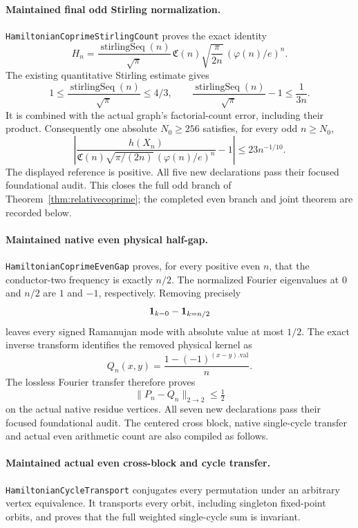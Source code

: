 \paragraph{Maintained final odd Stirling normalization.}
\texttt{HamiltonianCoprimeStirlingCount} proves the exact identity
\[
 H_n=\frac{\operatorname{stirlingSeq}(n)}{\sqrt\pi}\,
       \mathfrak C(n)\sqrt{\frac{\pi}{2n}}\,
                       (\varphi(n)/e)^n.
\]
The existing quantitative Stirling estimate gives
\[
 1\leq\frac{\operatorname{stirlingSeq}(n)}{\sqrt\pi}\leq4/3,
 \qquad
 \frac{\operatorname{stirlingSeq}(n)}{\sqrt\pi}-1
                                      \leq\frac1{3n}.
\]
It is combined with the actual graph's factorial-count error,
including their product. Consequently one absolute
\(N_0\geq256\) satisfies, for every odd \(n\geq N_0\),
\[
 \left|\frac{h(X_n)}
 {\mathfrak C(n)\sqrt{\pi/(2n)}\,(\varphi(n)/e)^n}-1\right|
                                     \leq23n^{-1/10}.
\]
The displayed reference is positive. All five new declarations
pass their focused foundational audit.
This closes the full odd branch of
Theorem~\ref{thm:relativecoprime}; the completed even branch and
joint theorem are recorded below.

\paragraph{Maintained native even physical half-gap.}
\texttt{HamiltonianCoprimeEvenGap} proves, for every positive
even \(n\), that the conductor-two frequency is exactly \(n/2\).
The normalized Fourier eigenvalues at \(0\) and \(n/2\)
are \(1\) and \(-1\), respectively. Removing precisely
\[
 {\bf1}_{k=0}-{\bf1}_{k=n/2}
\]
leaves every signed Ramanujan mode with absolute value at most
\(1/2\).
The exact inverse transform identifies the removed physical
kernel as
\[
 Q_n(x,y)=\frac{1-(-1)^{(x-y).\mathrm{val}}}{n}.
\]
The lossless Fourier transfer therefore proves
\[
 \|P_n-Q_n\|_{2\to2}\leq\tfrac12
\]
on the actual native residue vertices.
All seven new declarations pass their focused foundational audit.
The centered cross block, native single-cycle transfer and
actual even arithmetic count are also compiled as follows.

\paragraph{Maintained actual even cross-block and cycle transfer.}
\texttt{HamiltonianCycleTransport} conjugates every permutation
under an arbitrary vertex equivalence. It transports every
orbit, including singleton fixed-point orbits, and proves
that the full weighted single-cycle sum is invariant.

